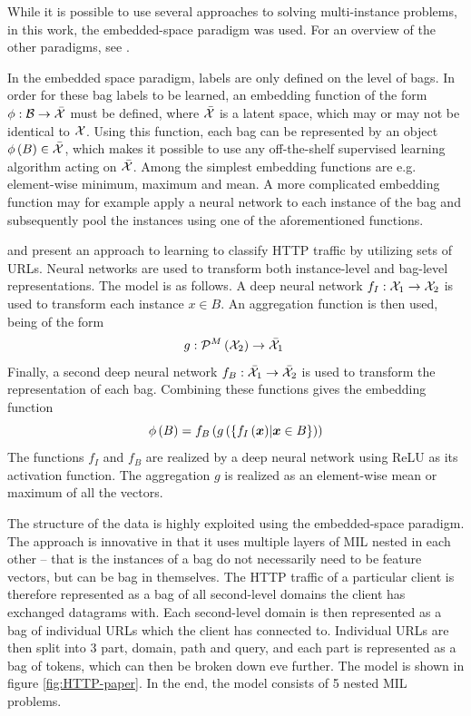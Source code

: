 While it is possible to use several approaches to solving multi-instance problems, in this work, the embedded-space paradigm was used. For an overview of the other paradigms, see \cite{dedic_optimalization_2020}.

In the embedded space paradigm, labels are only defined on the level of bags. In order for these bag labels to be learned, an embedding function of the form \( \phi : \mathcal{B} \to \bar{\mathcal{X}} \) must be defined, where \( \bar{\mathcal{X}} \) is a latent space, which may or may not be identical to \( \mathcal{X} \). Using this function, each bag can be represented by an object \( \phi \left( B \right) \in \bar{\mathcal{X}} \), which makes it possible to use any off-the-shelf supervised learning algorithm acting on \( \bar{\mathcal{X}} \). Among the simplest embedding functions are e.g. element-wise minimum, maximum and mean. A more complicated embedding function may for example apply a neural network to each instance of the bag and subsequently pool the instances using one of the aforementioned functions.

\cite{pevny_nested_2020} and \cite{dedic_hierarchicke_2017} present an approach to learning to classify HTTP traffic by utilizing sets of URLs. Neural networks are used to transform both instance-level and bag-level representations. The model is as follows. A deep neural network \( f_I : \mathcal{X}_1 \to \mathcal{X}_2 \) is used to transform each instance \( x \in B \). An aggregation function is then used, being of the form
\[ g: \mathcal{P}^M \left( \mathcal{X}_2 \right) \to \bar{\mathcal{X}}_1 \ \]
Finally, a second deep neural network \( f_B : \bar{\mathcal{X}}_1 \to \bar{\mathcal{X}}_2 \) is used to transform the representation of each bag. Combining these functions gives the embedding function
\[ \phi \left( B \right) = f_B \left( g \left( \left\{ f_I \left( \bm{x} \right) \middle| \bm{x} \in B \right\} \right) \right) \]
The functions \( f_I \) and \( f_B \) are realized by a deep neural network using ReLU as its activation function. The aggregation \( g \) is realized as an element-wise mean or maximum of all the vectors.

The structure of the data is highly exploited using the embedded-space paradigm. The approach is innovative in that it uses multiple layers of MIL nested in each other -- that is the instances of a bag do not necessarily need to be feature vectors, but can be bag in themselves. The HTTP traffic of a particular client is therefore represented as a bag of all second-level domains the client has exchanged datagrams with. Each second-level domain is then represented as a bag of individual URLs which the client has connected to. Individual URLs are then split into 3 part, domain, path and query, and each part is represented as a bag of tokens, which can then be broken down eve further. The model is shown in figure \ref{fig:HTTP-paper}. In the end, the model consists of 5 nested MIL problems.

